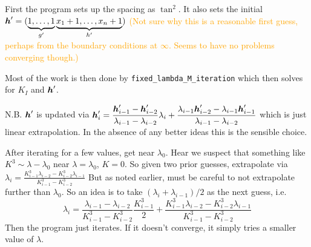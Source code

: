 First the program sets up the spacing as $\tan^2$. It also sets the
initial $\boldsymbol{h}'= (\underbrace{1,\dots,1}_{g'} \underbrace{x_1+1, \dots,
x_n+1}_{h'})$ \textcolor{orange}{(Not sure why this is a reasonable first
guess, perhaps from the boundary conditions at $\infty$. Seems to have
no problems converging though.)}

Most of the work is then done by \texttt{fixed\_lambda\_M\_iteration}
which then solves for $K_I$ and $\boldsymbol{h}'$. 

N.B. $\boldsymbol{h}'$ is updated via $\displaystyle \boldsymbol{h}_i' = \frac{\boldsymbol{h}_{i-1}'
-\boldsymbol{h}_{i-2}'}{\lambda_{i-1} - \lambda_{i-2}} \lambda_i + 
\frac{\lambda_{i-1}\boldsymbol{h}_{i-2}'-\lambda_{i-1}\boldsymbol{h}_{i-1}'}
{\lambda_{i-1} - \lambda_{i-2}} $ which is just linear extrapolation.
In the absence of any better ideas this is the sensible choice.

After iterating for a few values, get near $\lambda_0$. Hear we suspect
that something like $K^3 \sim \lambda-\lambda_0$ near $\lambda=\lambda_0$,
$K=0$. So given two prior guesses, extrapolate via 
$\displaystyle \lambda_i = \frac{K_{i-1}^3\lambda_{i-2} - K_{i-2}^3
\lambda_{i-1}}{K_{i-1}^3-K_{i-2}^3}$ But as noted earlier, must be careful
to not extrapolate further than $\lambda_0$. So an idea is to take $(\lambda_i
+ \lambda_{i-1})/2$ as the next guess, i.e. 
\[\lambda_i = 
\frac{\lambda_{i-1} - \lambda_{i-2}}{K_{i-1}^3-K_{i-2}^3}\frac{K_{i-1}^3}{2}
+ \frac{K_{i-1}^3\lambda_{i-2} - K_{i-2}^3 
\lambda_{i-1}}{K_{i-1}^3-K_{i-2}^3} \]
Then the program just iterates. If it doesn't converge, it simply tries a 
smaller value of $\lambda$.
